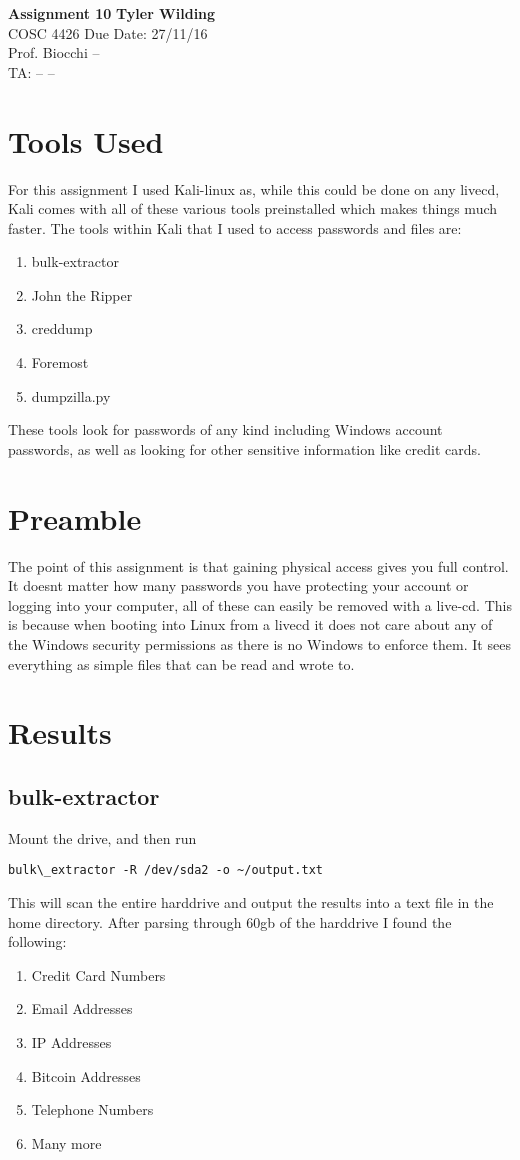 \documentclass[a4paper, 11pt]{article}
\begin{document}
\noindent
\large\textbf{Assignment 10} \hfill \textbf{Tyler Wilding} \\
\normalsize COSC 4426 \hfill Due Date: 27/11/16 \\
Prof. Biocchi \hfill -- \\
TA: -- \hfill --

\section*{Tools Used}
For this assignment I used Kali-linux as, while this could be done on any livecd, Kali comes with all of these various tools preinstalled which makes things much faster.  The tools within Kali that I used to access passwords and files are:
\begin{enumerate}
\item bulk-extractor
\item John the Ripper
\item creddump
\item Foremost
\item dumpzilla.py
\end{enumerate}

These tools look for passwords of any kind including Windows account passwords, as well as looking for other sensitive information like credit cards.

\section*{Preamble}
The point of this assignment is that gaining physical access gives you full control.  It doesnt matter how many passwords you have protecting your account or logging into your computer, all of these can easily be removed with a live-cd.  This is because when booting into Linux from a livecd it does not care about any of the Windows security permissions as there is no Windows to enforce them.  It sees everything as simple files that can be read and wrote to.

\section*{Results}
\subsection*{bulk-extractor}
Mount the drive, and then run 
\begin{lstlisting}
bulk\_extractor -R /dev/sda2 -o ~/output.txt
\end{lstlisting}
This will scan the entire harddrive and output the results into a text file in the home directory. After parsing through 60gb of the harddrive I found the following:
\begin{enumerate}
\item Credit Card Numbers
\item Email Addresses
\item IP Addresses
\item Bitcoin Addresses
\item Telephone Numbers
\item Many more
\end{enumerate}
\end{document}
